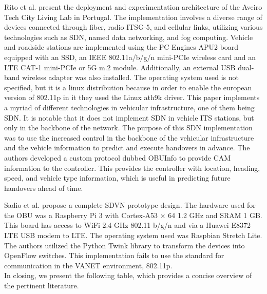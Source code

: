     
    Rito et al.\cite{rito_aveiro_2023} present the deployment and experimentation architecture of the Aveiro Tech City Living Lab in Portugal. The implementation involves a diverse range of devices connected through fiber, radio ITSG-5, and cellular links, utilizing various technologies such as SDN, named data networking, and fog computing.
    Vehicle and roadside stations are implemented using the PC Engines APU2 board equipped with an SSD, an IEEE 802.11a/b/g/n mini-PCIe wireless card and an LTE CAT-1 mini-PCIe or 5G m.2 module. Additionally, an external USB dual-band wireless adapter was also installed. The operating system used is not specified, but it is a linux distribution because in order to enable the european version of 802.11p in it they used the Linux ath9k driver.
    This paper implements a myriad of different technologies in vehicular infrastructure, one of them being SDN. It is notable that it does not implement SDN in vehicle ITS stations, but only in the backbone of the network. The purpose of this SDN implementation was to use the increased control in the backbone of the vehicular infrastructure and the vehicle information to predict and execute handovers in advance. The authors developed a custom protocol dubbed OBUInfo to provide CAM information to the controller. This provides the controller with location, heading, speed, and vehicle type information, which is useful in predicting future handovers ahead of time.
    
    
    Sadio et al.\cite{sadio_design_2020} propose a complete SDVN prototype design. The hardware used for the OBU was a Raspberry Pi 3 with Cortex-A53 × 64 1.2 GHz and SRAM 1 GB. This board has access to WiFi 2.4 GHz 802.11 b/g/n and via a Huawei E8372 LTE USB modem to LTE. The operating system used was Raspbian Stretch Lite. The authors utilized the Python Twink library to transform the devices into OpenFlow switches. This implementation fails to use the standard for communication in the VANET environment, 802.11p.
    \\
    In closing, we present the following table, which provides a concise overview of the pertinent literature.

